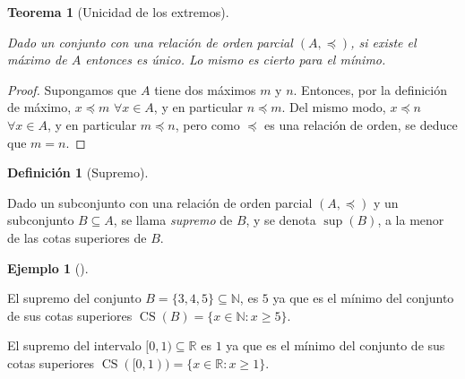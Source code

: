 \documentclass[
  a4paper,
]{scrreport}
\theoremstyle{definition}
\newtheorem{definition}{Definición}[chapter]
\theoremstyle{plain}
\newtheorem{theorem}{Teorema}[chapter]
\theoremstyle{plain}
\theoremstyle{definition}
\theoremstyle{definition}
\newtheorem{example}{Ejemplo}[chapter]
\theoremstyle{plain}
\theoremstyle{remark}
\begin{document}
\begin{theorem}[Unicidad de los
extremos]\protect\hypertarget{thm-unicidad-extremos}{}\label{thm-unicidad-extremos}

Dado un conjunto con una relación de orden parcial \((A,\preceq)\), si
existe el máximo de \(A\) entonces es único. Lo mismo es cierto para el
mínimo.

\end{theorem}

\begin{tcolorbox}[enhanced jigsaw, breakable, title=\textcolor{quarto-callout-note-color}{\faInfo}\hspace{0.5em}{Demostración}, toprule=.15mm, coltitle=black, arc=.35mm, rightrule=.15mm, colframe=quarto-callout-note-color-frame, colbacktitle=quarto-callout-note-color!10!white, toptitle=1mm, titlerule=0mm, leftrule=.75mm, opacityback=0, colback=white, bottomrule=.15mm, bottomtitle=1mm, left=2mm, opacitybacktitle=0.6]

\begin{proof}

Supongamos que \(A\) tiene dos máximos \(m\) y \(n\). Entonces, por la
definición de máximo, \(x\preceq m\) \(\forall x\in A\), y en particular
\(n\preceq m\). Del mismo modo, \(x\preceq n\) \(\forall x\in A\), y en
particular \(m\preceq n\), pero como \(\preceq\) es una relación de
orden, se deduce que \(m=n\).

\end{proof}

\end{tcolorbox}

\begin{definition}[Supremo]\protect\hypertarget{def-supremo-conjunto}{}\label{def-supremo-conjunto}

Dado un subconjunto con una relación de orden parcial \((A,\preceq)\) y
un subconjunto \(B\subseteq A\), se llama \emph{supremo} de \(B\), y se
denota \(\sup(B)\), a la menor de las cotas superiores de \(B\).

\end{definition}

\begin{example}[]\protect\hypertarget{exm-supremo}{}\label{exm-supremo}

El supremo del conjunto \(B=\{3, 4, 5\}\subseteq \mathbb{N}\), es \(5\)
ya que es el mínimo del conjunto de sus cotas superiores
\(\operatorname{CS}(B)=\{x\in \mathbb{N}:x\geq 5\}\).

El supremo del intervalo \([0,1)\subseteq \mathbb{R}\) es \(1\) ya que
es el mínimo del conjunto de sus cotas superiores
\(\operatorname{CS}([0,1)) = \{x\in \mathbb{R}:x\geq 1\}\).

\end{example}
\end{document}
